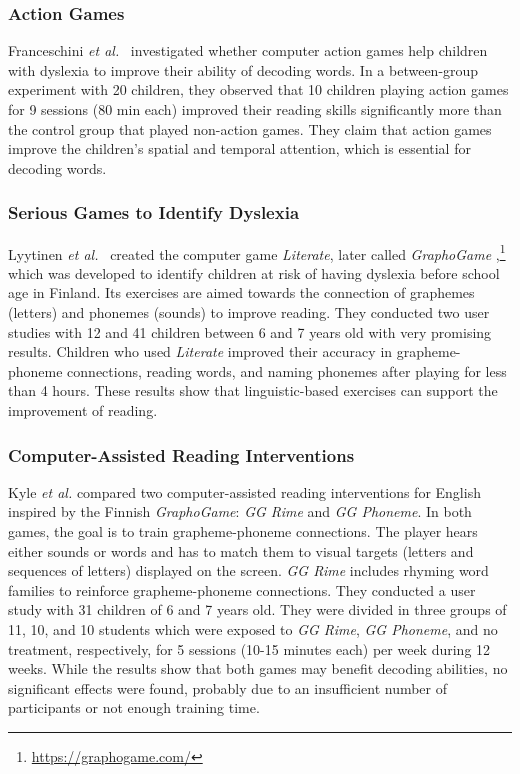 \documentclass[letterpaper]{sig-alternate-2013}
\begin{document}
\subsubsection{Action Games} 
Franceschini {\it et al.}~\cite{Franceschini2013} investigated whether computer action games help children with dyslexia to improve their ability of decoding words. In a between-group experiment with 20 children, they observed that 10 children playing action games for 9 sessions (80 min each) improved their reading skills significantly more than the control group that played non-action games. They claim that action games improve the children's spatial and temporal attention, which is essential for decoding words.


\subsubsection{Serious Games to Identify Dyslexia}
Lyytinen {\it et al.}~\cite{Lyytinen2007} created the computer game {\it Literate}, later called {\it GraphoGame} \cite{Lyytinen2009},\footnote{\small\url{https://graphogame.com/}} which was developed to identify children at risk of having dyslexia before school age in Finland. Its exercises are aimed towards the connection of graphemes (letters) and phonemes (sounds) to improve reading.
They conducted two user studies with 12 and 41 children between 6 and 7 years old with very promising results. Children who used  {\it Literate} improved their accuracy in grapheme-phoneme connections, reading words, and naming phonemes after playing for less than 4 hours. These results show that linguistic-based exercises can support the improvement of reading.




\subsubsection{Computer-Assisted Reading Interventions}

\sloppy
Kyle {\it et al.} \cite{Kyle2013} compared two computer-assisted reading interventions for English inspired by the Finnish {\it GraphoGame}: {\it GG Rime} and {\it GG Phoneme}. In both games, the goal is to train grapheme-phoneme connections. The player hears either sounds or words and has to match them to visual targets (letters and sequences of letters) displayed on the screen. {\it GG Rime} includes rhyming word families to reinforce grapheme-phoneme connections.
They conducted a user study with 31 children of 6 and 7 years old. They were divided in three groups of 11, 10, and 10 students which were exposed to {\it GG Rime}, {\it GG Phoneme}, and no treatment, respectively, for 5 sessions (10-15 minutes each) per week during 12 weeks. 
While the results show that both games may benefit decoding abilities, no significant effects were found, probably due to an insufficient number of participants or not enough training time.
\end{document}
